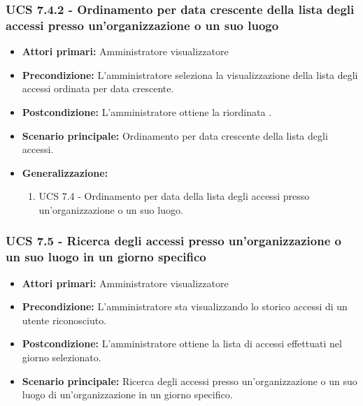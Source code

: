 \subsubsection{UCS 7.4.2 - Ordinamento per data crescente della lista degli accessi presso un'organizzazione o un suo luogo}
\begin{itemize}
    \item \textbf{Attori primari:} Amministratore visualizzatore
    \item \textbf{Precondizione:} L'amministratore seleziona la visualizzazione della lista degli accessi ordinata per data crescente.
    \item \textbf{Postcondizione:} L'amministratore ottiene la  riordinata .
    \item \textbf{Scenario principale:} Ordinamento per data crescente della lista degli accessi.
    \item \textbf{Generalizzazione:}
	\begin{enumerate}
		\item UCS 7.4 - Ordinamento per data della lista degli accessi presso un'organizzazione o un suo luogo.
	\end{enumerate}
\end{itemize}

\subsubsection{UCS 7.5 - Ricerca degli accessi presso un'organizzazione o un suo luogo in un giorno specifico}
\begin{itemize}
    \item \textbf{Attori primari:} Amministratore visualizzatore
    \item \textbf{Precondizione:} L'amministratore sta visualizzando lo storico accessi di un utente riconosciuto.
    \item \textbf{Postcondizione:} L'amministratore ottiene la lista di accessi effettuati nel giorno selezionato.
    \item \textbf{Scenario principale:} Ricerca degli accessi presso un'organizzazione o un suo luogo di un'organizzazione in un giorno specifico.
\end{itemize}